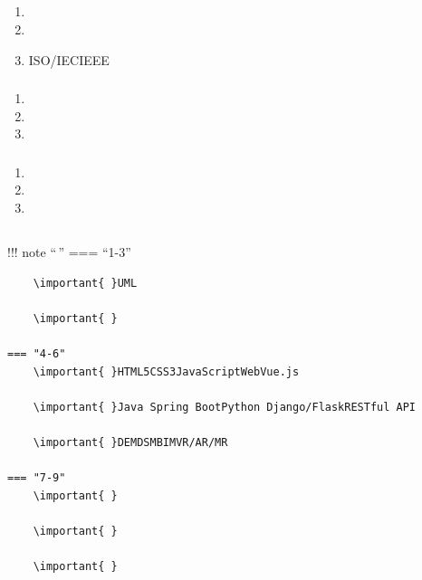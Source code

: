 \hypertarget{section-32}{%
\subsection{}\label{section-32}}

\hypertarget{section-33}{%
\subsubsection{}\label{section-33}}

\begin{enumerate}
\def\labelenumi{\arabic{enumi}.}
\item
  \important{}
\item
  \important{}
\item
  \important{}ISO/IECIEEE
\end{enumerate}

\hypertarget{section-34}{%
\subsubsection{}\label{section-34}}

\begin{enumerate}
\def\labelenumi{\arabic{enumi}.}
\item
  \important{}
\item
  \important{}
\item
  \important{}
\end{enumerate}

\hypertarget{section-35}{%
\subsubsection{}\label{section-35}}

\begin{enumerate}
\def\labelenumi{\arabic{enumi}.}
\item
  \important{}
\item
  \important{}
\item
  \important{}
\end{enumerate}

\hypertarget{section-36}{%
\subsection{}\label{section-36}}

!!! note ``\,'' === ``1-3'' \important{ }

\begin{verbatim}
    \important{ }UML
    
    \important{ }

=== "4-6"
    \important{ }HTML5CSS3JavaScriptWebVue.js
    
    \important{ }Java Spring BootPython Django/FlaskRESTful API
    
    \important{ }DEMDSMBIMVR/AR/MR

=== "7-9"
    \important{ }
    
    \important{ }
    
    \important{ }
\end{verbatim}

